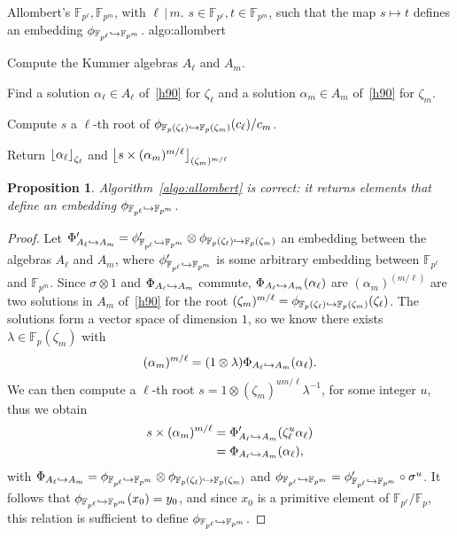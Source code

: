 \documentclass{sig-alternate}
\newtheorem{proposition}{Proposition}
\begin{document}
\begin{algorithm_endline}
  {Allombert's}
  {$\mathbb{F}_{p^\ell}, \mathbb{F}_{p^m}$, with $\ell\,|\,m$.}
  {$s\in\mathbb{F}_{p^\ell}, t\in\mathbb{F}_{p^m}$, such that the map $s\mapsto t$
  defines an embedding $\phi_{\mathbb{F}_{p^{\ell}}\hookrightarrow\mathbb{F}_{p^{m}}}$.}
  {algo:allombert}
\item Compute the Kummer algebras $A_\ell$ and $A_m$.
\item Find a solution $\alpha_\ell\in A_\ell$ of~\eqref{h90} for $\zeta_\ell$
  and a solution $\alpha_m\in A_m$ of~\eqref{h90} for $\zeta_m$.
\item Compute $s$ a $\ell$-th root of $\phi_{\mathbb{F}_{p}(\zeta_{\ell})\hookrightarrow\mathbb{F}_{p}(\zeta_{m})}(c_\ell)/c_m$.
\item Return $\left\lfloor \alpha_{\ell} \right\rfloor_{\zeta_\ell}$ and $\left\lfloor s\times
    (\alpha_m)^{m/\ell} \right\rfloor_{(\zeta_m)^{m/\ell}}$
\end{algorithm_endline}

\begin{proposition}
  Algorithm~\ref{algo:allombert} is correct: it returns elements that define an
  embedding $\phi_{\mathbb{F}_{p^{\ell}}\hookrightarrow\mathbb{F}_{p^{m}}}$.
\end{proposition}
\begin{proof}
  Let $\Phi_{A_{\ell}\hookrightarrow A_{m}}'=\phi_{\mathbb{F}_{p^{\ell}}\hookrightarrow\mathbb{F}_{p^{m}}}'\otimes\phi_{\mathbb{F}_{p}(\zeta_{\ell})\hookrightarrow\mathbb{F}_{p}(\zeta_{m})}$ an embedding
  between the algebras $A_\ell$ and $A_m$, where $\phi_{\mathbb{F}_{p^{\ell}}\hookrightarrow\mathbb{F}_{p^{m}}}'$ is some
  arbitrary embedding between $\mathbb{F}_{p^\ell}$ and $\mathbb{F}_{p^m}$.
  Since $\sigma\otimes1$ and $\Phi_{A_{\ell}\hookrightarrow A_{m}}$ commute,
  $\Phi_{A_{\ell}\hookrightarrow A_{m}}(\alpha_\ell)$ are $(\alpha_m)^{(m/\ell)}$ are two solutions
  in $A_m$ of~\eqref{h90} for the root $(\zeta_m)^{m/\ell} =
  \phi_{\mathbb{F}_{p}(\zeta_{\ell})\hookrightarrow\mathbb{F}_{p}(\zeta_{m})}(\zeta_\ell)$. The solutions form a vector space of
  dimension $1$, so we know there exists $\lambda\in\mathbb{F}_{p}(\zeta_m)$
  with
  \[
    (\alpha_m)^{m/\ell} = (1\otimes\lambda)\Phi_{A_{\ell}\hookrightarrow A_{m}}(\alpha_\ell).
  \]
  We can then compute a $\ell$-th root $s = 1\otimes(\zeta_{m})^{um/\ell}\lambda^{-1}$, for some
  integer $u$, thus we obtain
  \begin{align*}
    s\times(\alpha_m)^{m/\ell} &= \Phi_{A_{\ell}\hookrightarrow A_{m}}'(\zeta_\ell^u\alpha_\ell)\\
    &= \Phi_{A_{\ell}\hookrightarrow A_{m}}(\alpha_\ell),
  \end{align*}
  with $\Phi_{A_{\ell}\hookrightarrow A_{m}}=\phi_{\mathbb{F}_{p^{\ell}}\hookrightarrow\mathbb{F}_{p^{m}}}\otimes\phi_{\mathbb{F}_{p}(\zeta_{\ell})\hookrightarrow\mathbb{F}_{p}(\zeta_{m})}$ and
  $\phi_{\mathbb{F}_{p^{\ell}}\hookrightarrow\mathbb{F}_{p^{m}}} = \phi_{\mathbb{F}_{p^{\ell}}\hookrightarrow\mathbb{F}_{p^{m}}}'\circ\sigma^u$. It follows that
  $\phi_{\mathbb{F}_{p^{\ell}}\hookrightarrow\mathbb{F}_{p^{m}}}(x_0)=y_0$, and since $x_0$ is a primitive element of
  $\mathbb{F}_{p^\ell}/\mathbb{F}_{p}$, this relation is sufficient to define
  $\phi_{\mathbb{F}_{p^{\ell}}\hookrightarrow\mathbb{F}_{p^{m}}}$.
\end{proof}
\end{document}
